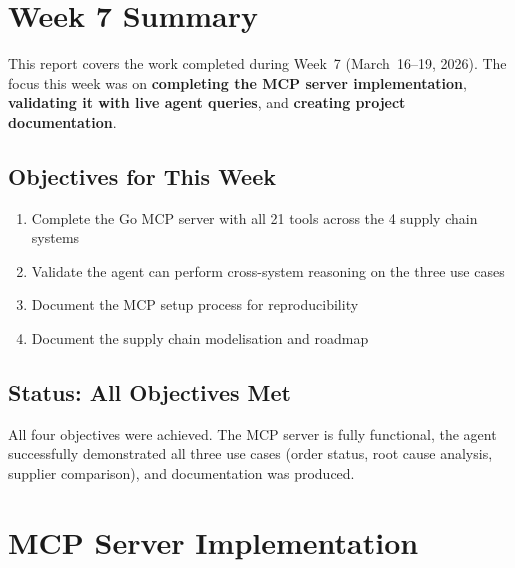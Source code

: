 \documentclass[12pt,a4paper]{report}
\begin{document}
\newpage
{}

\chapter{Week 7 Summary}

This report covers the work completed during Week~7 (March~16--19, 2026). The focus this week was on \textbf{completing the MCP server implementation}, \textbf{validating it with live agent queries}, and \textbf{creating project documentation}.

\section{Objectives for This Week}

\begin{enumerate}[itemsep=0.3em]
    \item Complete the Go MCP server with all 21 tools across the 4 supply chain systems
    \item Validate the agent can perform cross-system reasoning on the three use cases
    \item Document the MCP setup process for reproducibility
    \item Document the supply chain modelisation and roadmap
\end{enumerate}

\section{Status: All Objectives Met}

All four objectives were achieved. The MCP server is fully functional, the agent successfully demonstrated all three use cases (order status, root cause analysis, supplier comparison), and documentation was produced.

\chapter{MCP Server Implementation}
\end{document}
